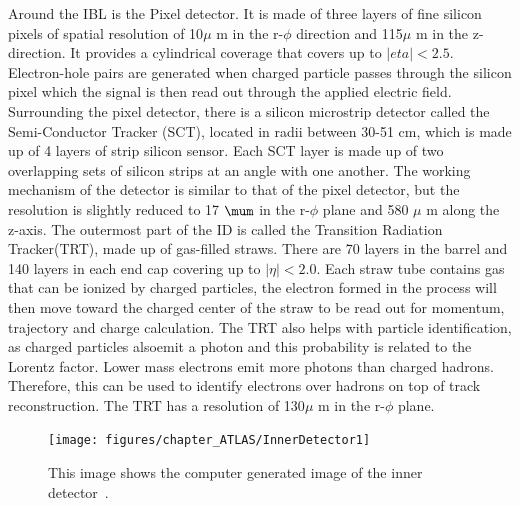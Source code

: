 Around the IBL is the Pixel detector. It is made of three layers of fine silicon pixels of spatial resolution of 10$\mu$ m in the r-$\phi$ direction and 115$\mu$ m in the z-direction. It provides a cylindrical coverage that covers up to $|eta|<2.5$. Electron-hole pairs are generated when charged particle passes through the silicon pixel which the signal is then read out through the applied electric field.
Surrounding the pixel detector, there is a silicon microstrip detector called the Semi-Conductor Tracker (SCT), located in radii between 30-51 cm, which is made up of 4 layers of strip silicon sensor. Each SCT layer is made up of two overlapping sets of silicon strips at an angle with one another. The working mechanism of the detector is similar to that of the pixel detector, but the resolution is slightly reduced to 17 $\mum$ in the r-$\phi$ plane and 580 $\mu$ m along the z-axis. 
The outermost part of the ID is called the Transition Radiation Tracker(TRT), made up of gas-filled straws. There are 70 layers in the barrel and 140 layers in each end cap covering up to $|\eta|<2.0$. Each straw tube contains gas that can be ionized by charged particles, the electron formed in the process will then move toward the charged center of the straw to be read out for momentum, trajectory and charge calculation. The TRT also helps with particle identification, as charged particles alsoemit a photon and this probability is related to the Lorentz factor. Lower mass electrons emit more photons than charged hadrons. Therefore, this can be used to identify electrons over hadrons on top of track reconstruction. The TRT has a resolution of 130$\mu$ m in the r-$\phi$ plane.

\begin{figure}[!htb]
    \begin{center}
        \texttt{[image: figures/chapter\_ATLAS/InnerDetector1]}
        \caption{
            This image shows the computer generated image of the inner detector~\cite{Pequenao:1095926}.
        }
        \label{fig:InnerDetector}
    \end{center}
\end{figure}

